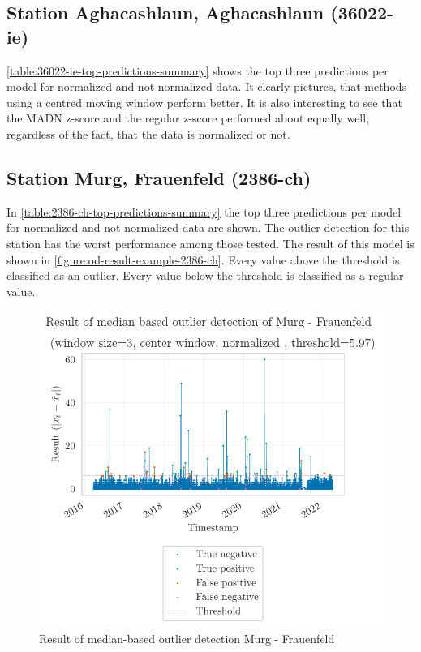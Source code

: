 \subsection{Station Aghacashlaun, Aghacashlaun (36022-ie)}
\autoref{table:36022-ie-top-predictions-summary} shows the top three predictions per model for normalized and not normalized data. It clearly pictures, that methods using a centred moving window perform better. It is also interesting to see that the \ac{MADN} z-score and the regular z-score performed about equally well, regardless of the fact, that the data is normalized or not.

\clearpage
\subsection{Station Murg, Frauenfeld (2386-ch)}
In \autoref{table:2386-ch-top-predictions-summary} the top three predictions per model for normalized and not normalized data are shown. The outlier detection for this station has the worst performance among those tested. The result of this model is shown in \autoref{figure:od-result-example-2386-ch}. Every value above the threshold is classified as an outlier. Every value below the threshold is classified as a regular value.

\begin{figure}[htp]
    \centering 
    \includegraphics{plots/pdfs/2386-ch/od_result_median_2386-ch_all.pdf}
    \caption{Result of median-based outlier detection Murg - Frauenfeld}
    \label{figure:od-result-example-2386-ch}
\end{figure}
\clearpage
